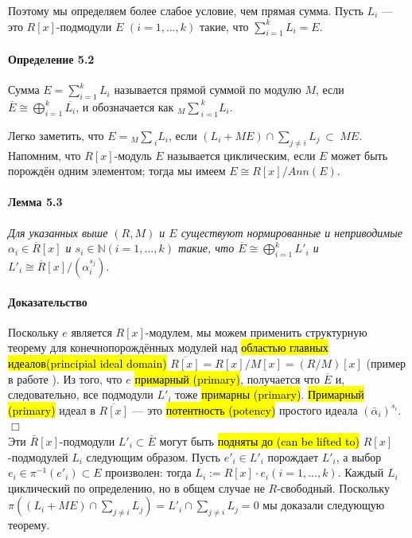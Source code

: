 \documentclass[a4paper,12pt]{article}
\newcommand{\dirsummod}[1]{{_{{#1}}\!\!\sum}}
\begin{document}
Поэтому мы определяем более слабое условие, чем прямая сумма. Пусть $L_i$ --- это $R[x]$-подмодули $E$ $(i = 1,...,k)$ такие, что $\sum_{i=1}^{k} L_i = E$.

\paragraph{Определение 5.2}
Сумма $E = \sum_{i=1}^{k} L_i$ называется прямой суммой по модулю $M$, если $\overline{E} \cong \bigoplus_{i=1}^{k} \overline{L_i}$, и обозначается как $\dirsummod{M}_{i=1}^{k} L_i$.

Легко заметить, что $E = \dirsummod{M}_i L_i$, если $(L_i + M E) \cap \sum_{j \ne i} L_j ~ \subset ~ M E$. Напомним, что $R[x]$-модуль $E$ называется циклическим, если $E$ может быть порождён одним элементом; тогда мы имеем $E \cong R[x]/Ann(E)$.

\paragraph{Лемма 5.3}
{\itshape
Для указанных выше $(R, M)$ и $E$ существуют нормированные и неприводимые $\alpha_i \in \overline{R}[x]$ и $s_i \in \mathbb{N} (i = 1,...,k)$ такие, что $\overline{E} \cong \bigoplus_{i=1}^{k} L'_i$ и $L'_i \cong \overline{R}[x]/(\alpha_i^{s_j})$.
}

\paragraph{Доказательство}

Поскольку $e$ является $R[x]$-модулем, мы можем применить структурную теорему для конечнопорождённых модулей над \hl{областью главных идеалов(principial ideal domain)} $\overline{R[x]} = R[x]/M[x] = (R/M)[x]$ (пример в работе \cite{bib3}). Из того, что $e$ \hl{примарный (primary)}, получается что $\overline{E}$ и, следовательно, все подмодули $L'_i$ тоже \hl{примарны (primary)}. \hl{Примарный (primary)} идеал в $\overline{R[x]}$ --- это \hl{потентность (potency)} простого идеала $(\bar{\alpha}_i)^{s_i}$. $\Box$ \\


Эти $\bar{R}[x]$-подмодули $L'_i \subset \bar{E}$ могут быть \hl{подняты до (can be lifted to)} $R[x]$-подмодулей $L_i$ следующим образом. Пусть $e'_i \in L'_i$ порождает $L'_i$, а выбор $e_i \in \pi ^{-1} (e'_i) \subset E $ произволен: тогда $L_i := R[x] \cdot e_i (i = 1, ..., k)$. Каждый $L_i$ циклический по определению, но в общем случае не $R$-свободный. Поскольку $\pi ((L_i + M E) \cap \sum_{j \ne i}L_j) = L'_i \cap \sum_{j \ne i} L_j = 0$ мы доказали следующую теорему.
\end{document}
